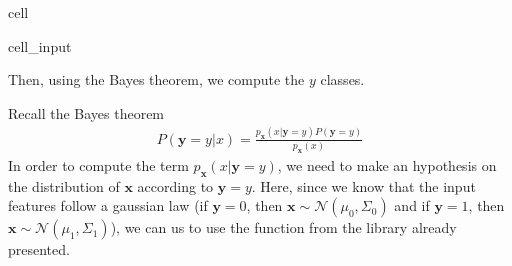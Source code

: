 \documentclass[letterpaper,10pt,english]{jupyterBook}
\begin{document}
\begin{sphinxuseclass}{cell}\begin{sphinxVerbatimInput}

\begin{sphinxuseclass}{cell_input}
\begin{sphinxVerbatim}[commandchars=\\\{\}]
  
   
     
        \PYG{p}{[}\PYG{p}{]}    
       \PYG{p}{[}\PYG{p}{]}      
\end{sphinxVerbatim}

\end{sphinxuseclass}\end{sphinxVerbatimInput}

\end{sphinxuseclass}
\sphinxAtStartPar
Then, using the Bayes theorem, we compute the \(y\) classes.

\sphinxAtStartPar
Recall the Bayes theorem
\begin{equation*}
\begin{split}P(\mathbf{y}=y|x) = \frac{p_\mathbf{x}(x|\mathbf{y}=y)P(\mathbf{y}=y)}{p_\mathbf{x}(x)}\end{split}
\end{equation*}
\sphinxAtStartPar
In order to compute the term \(p_\mathbf{x}(x|\mathbf{y}=y)\), we need to make an hypothesis on the distribution of \(\mathbf{x}\) according to \(\mathbf{y}=y\). Here, since we know that the input features follow a gaussian law (if \(\mathbf{y} = 0\), then \(\mathbf{x} \sim \mathcal{N}(\mu_0, \Sigma_0)\) and if \(\mathbf{y} = 1\), then \(\mathbf{x} \sim \mathcal{N}(\mu_1, \Sigma_1)\)), we can us to use the  function from the  library already presented.
\end{document}
